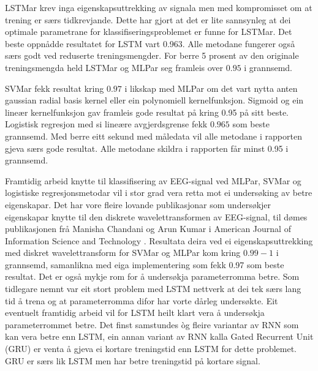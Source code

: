 \documentclass[oneside, nynorsk]{book}
\begin{document}
LSTMar krev inga eigenskapsuttrekking av signala men med kompromisset om at trening er særs tidkrevjande.
Dette har gjort at det er lite sannsynleg at dei optimale parametrane for klassifiseringsproblemet er funne for LSTMar. Det beste oppnådde resultatet for LSTM vart 0.963.
Alle metodane fungerer også særs godt ved reduserte treningsmengder. For berre 5 prosent av den originale treningsmengda held LSTMar og MLPar seg framleis over $0.95$ i grannsemd.

SVMar fekk resultat kring $0.97$ i likskap med MLPar om det vart nytta anten gaussian radial basis kernel eller ein polynomiell kernelfunksjon.
Sigmoid og ein lineær kernelfunksjon gav framleis gode resultat på kring 0.95 på sitt beste. Logistisk regresjon med si lineære avgjerdsgrense fekk $0.965$ som beste grannsemd.
Med berre eitt sekund med måledata vil alle metodane i rapporten gjeva særs gode resultat. Alle metodane skildra i rapporten får minst 0.95 i grannsemd.

Framtidig arbeid knytte til klassifisering av EEG-signal ved MLPar, SVMar og logistiske regresjonsmetodar vil i stor grad vera retta mot ei undersøking av betre eigenskapar.
Det har vore fleire lovande publikasjonar som undersøkjer eigenskapar knytte til den diskrete wavelettransformen av EEG-signal, til dømes publikasjonen frå
Manisha Chandani og Arun Kumar i American Journal of Information Science and Technology \cite{DWT}.
Resultata deira ved ei eigenskapsuttrekking med diskret wavelettransform for SVMar og MLPar kom kring $0.99-1$ i grannsemd,
samanlikna med eiga implementering som fekk 0.97 som beste resultat. Det er også mykje rom for å undersøkja parameterromma betre.
\newpage
Som tidlegare nemnt var eit stort problem med LSTM nettverk at dei tek særs lang tid å trena og at parameterromma difor har vorte dårleg undersøkte.
Eit eventuelt framtidig arbeid vil for LSTM heilt klart vera å undersøkja parameterrommet betre.
Det finst samstundes òg fleire variantar av RNN som kan vera betre enn LSTM, ein annan variant av RNN kalla Gated Recurrent Unit (GRU) er
venta å gjeva ei kortare treningstid enn LSTM for dette problemet. GRU er særs lik LSTM men har betre treningstid på kortare signal.
\end{document}
